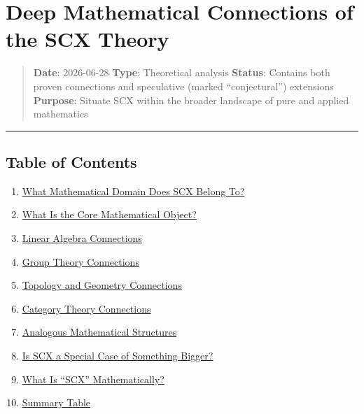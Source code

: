 \documentclass[
  12pt,
]{article}
\author{SCX}
\date{2026}
\providecommand{\tightlist}{%
  \setlength{\itemsep}{0pt}\setlength{\parskip}{0pt}}
\begin{document}
\section{Deep Mathematical Connections of the SCX
Theory}\label{deep-mathematical-connections-of-the-scx-theory}

\begin{quote}
\textbf{Date}: 2026-06-28 \textbar{} \textbf{Type}: Theoretical analysis
\textbf{Status}: Contains both proven connections and speculative
(marked ``conjectural'') extensions \textbf{Purpose}: Situate SCX within
the broader landscape of pure and applied mathematics
\end{quote}

\begin{center}\rule{0.5\linewidth}{0.5pt}\end{center}

\subsection{Table of Contents}\label{table-of-contents}

\begin{enumerate}
\def\labelenumi{\arabic{enumi}.}
\tightlist
\item
  \hyperref[1-what-mathematical-domain-does-scx-belong-to]{What
  Mathematical Domain Does SCX Belong To?}
\item
  \hyperref[2-what-is-the-core-mathematical-object]{What Is the Core
  Mathematical Object?}
\item
  \hyperref[3-linear-algebra-connections]{Linear Algebra Connections}
\item
  \hyperref[4-group-theory-connections]{Group Theory Connections}
\item
  \hyperref[5-topology-and-geometry-connections]{Topology and Geometry
  Connections}
\item
  \hyperref[6-category-theory-connections]{Category Theory Connections}
\item
  \hyperref[7-analogous-mathematical-structures]{Analogous Mathematical
  Structures}
\item
  \hyperref[8-is-scx-a-special-case-of-something-bigger]{Is SCX a
  Special Case of Something Bigger?}
\item
  \hyperref[9-what-is-scx-mathematically]{What Is ``SCX''
  Mathematically?}
\item
  \hyperref[10-summary-table]{Summary Table}
\end{enumerate}
\end{document}
